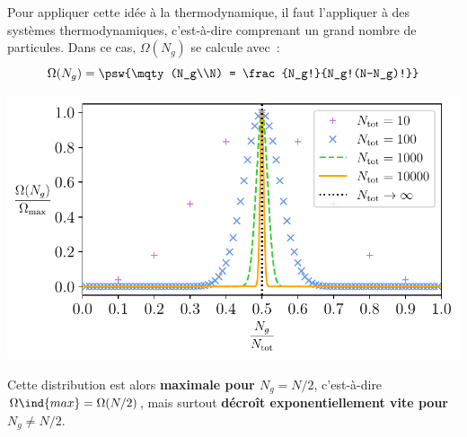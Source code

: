 \documentclass[../../main/main.tex]{subfiles}
\begin{document}
\noindent
\begin{minipage}[c]{.50\linewidth}
	Pour appliquer cette idée à la thermodynamique, il faut l'appliquer à des
	systèmes thermodynamiques, c'est-à-dire comprenant un grand nombre de
	particules. Dans ce cas, $\Omega(N_g)$ se calcule avec~:
	\[
		\Omega(N_g) = \psw{\mqty(N_g\\N) = \frac{N_g!}{N_g!(N-N_g)!}}
	\]
\end{minipage}
\hfill
\begin{minipage}[c]{.48\linewidth}
	\begin{center}
		\includegraphics[width=\linewidth]{proba_etat}
	\end{center}
\end{minipage}

Cette distribution est alors \textbf{maximale pour $N_g = N/2$}, c'est-à-dire
$\Omega\ind{max} = \Omega(N/2)$, mais surtout \textbf{décroît exponentiellement
	vite pour $N_g \neq N/2$}.
\end{document}
